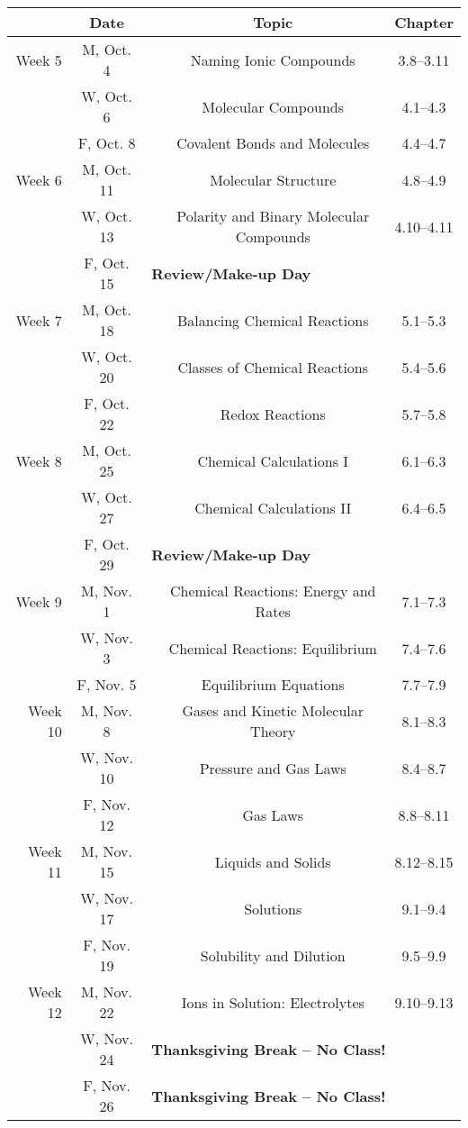 \documentclass[12pt, letterpaper]{article}
\begin{document}
\begin{tabular}{rcccc}
& Date && Topic & Chapter\\
	\midrule
	Week 5 & M, Oct. 4&& Naming Ionic Compounds & 3.8--3.11\\
	& W, Oct. 6&& Molecular Compounds & 4.1--4.3\\
	& F, Oct. 8&& Covalent Bonds and Molecules & 4.4--4.7\\
	\midrule
	Week 6 & M, Oct. 11&& Molecular Structure & 4.8--4.9\\
	& W, Oct. 13&& Polarity and Binary Molecular Compounds & 4.10--4.11\\
	& F, Oct. 15& \multicolumn{3}{l}{\textbf{Review/Make-up Day}}\\
	\midrule
	Week 7 & M, Oct. 18&& Balancing Chemical Reactions & 5.1--5.3\\
	& W, Oct. 20&& Classes of Chemical Reactions & 5.4--5.6\\
	& F, Oct. 22&& Redox Reactions & 5.7--5.8\\
	\midrule
	Week 8 & M, Oct. 25&& Chemical Calculations I & 6.1--6.3\\
	& W, Oct. 27&& Chemical Calculations II & 6.4--6.5\\
	& F, Oct. 29& \multicolumn{3}{l}{\textbf{Review/Make-up Day}}\\
	\midrule
	Week 9 & M, Nov. 1&& Chemical Reactions: Energy and Rates & 7.1--7.3\\
	& W, Nov. 3&& Chemical Reactions: Equilibrium & 7.4--7.6\\
	& F, Nov. 5&& Equilibrium Equations & 7.7--7.9\\
	\midrule
	Week 10 & M, Nov. 8&& Gases and Kinetic Molecular Theory & 8.1--8.3\\
	& W, Nov. 10&& Pressure and Gas Laws & 8.4--8.7\\
	& F, Nov. 12&& Gas Laws & 8.8--8.11\\
	\midrule
	Week 11 & M, Nov. 15&& Liquids and Solids & 8.12--8.15\\
	& W, Nov. 17&& Solutions & 9.1--9.4\\
	& F, Nov. 19&& Solubility and Dilution & 9.5--9.9\\
	\midrule
	Week 12 & M, Nov. 22&& Ions in Solution: Electrolytes & 9.10--9.13\\
	& W, Nov. 24& \multicolumn{3}{l}{\textbf{Thanksgiving Break -- No Class!}}\\
	& F, Nov. 26& \multicolumn{3}{l}{\textbf{Thanksgiving Break -- No Class!}}\\
\end{tabular}
\end{document}

